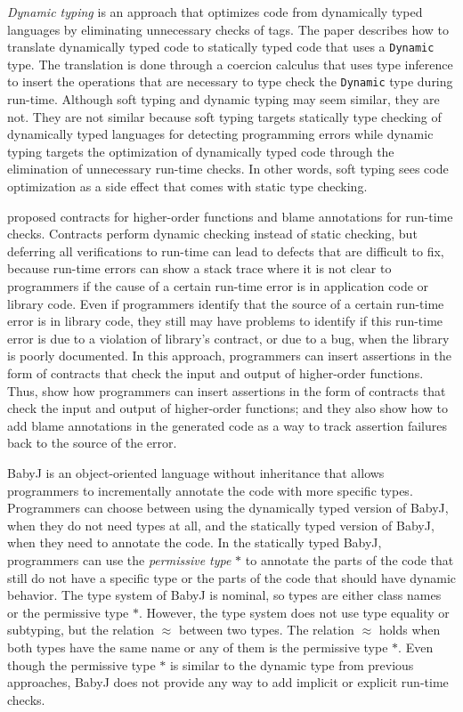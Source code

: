 \documentclass[preprint]{sig-alternate}
\begin{document}
\textit{Dynamic typing} \citep{henglein1994dts} is an approach
that optimizes code from dynamically typed languages by eliminating
unnecessary checks of tags.
The paper describes how to translate dynamically typed code to
statically typed code that uses a \texttt{Dynamic} type.
The translation is done through a coercion calculus that uses type
inference to insert the operations that are necessary to type check
the \texttt{Dynamic} type during run-time.
Although soft typing and dynamic typing may seem similar, they are not.
They are not similar because soft typing targets statically type
checking of dynamically typed languages for detecting programming
errors while dynamic typing targets the optimization of dynamically
typed code through the elimination of unnecessary run-time checks.
In other words, soft typing sees code optimization as a side effect
that comes with static type checking.

\citet{findler2002chf} proposed contracts for higher-order functions
and blame annotations for run-time checks.
Contracts perform dynamic checking instead of static checking,
but deferring all verifications to run-time can lead to defects
that are difficult to fix, because run-time errors can show a
stack trace where it is not clear to programmers if the cause of a
certain run-time error is in application code or library code.
Even if programmers identify that the source of a certain run-time
error is in library code, they still may have problems to identify
if this run-time error is due to a violation of library's contract,
or due to a bug, when the library is poorly documented.
In this approach, programmers can insert assertions in the form of
contracts that check the input and output of higher-order functions.
Thus, \citet{findler2002chf} show how programmers can insert
assertions in the form of contracts that check the input and output
of higher-order functions; and they also show how to add blame
annotations in the generated code as a way to track assertion
failures back to the source of the error.

BabyJ \citep{anderson2002babyj} is an object-oriented language
without inheritance that allows programmers to incrementally annotate
the code with more specific types.
Programmers can choose between using the dynamically typed version
of BabyJ, when they do not need types at all, and the statically
typed version of BabyJ, when they need to annotate the code.
In the statically typed BabyJ, programmers can use the
\textit{permissive type} $*$ to annotate the parts of the code that
still do not have a specific type or the parts of the code that should
have dynamic behavior.
The type system of BabyJ is nominal, so types are either class names
or the permissive type $*$.
However, the type system does not use type equality or subtyping,
but the relation $\approx$ between two types.
The relation $\approx$ holds when both types have the same name or
any of them is the permissive type $*$.
Even though the permissive type $*$ is similar to the dynamic type
from previous approaches, BabyJ does not provide any way to add
implicit or explicit run-time checks.
\end{document}

